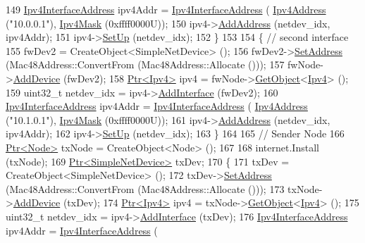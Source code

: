 \begin{DoxyCode}
149     \hyperlink{classns3_1_1Ipv4InterfaceAddress}{Ipv4InterfaceAddress} ipv4Addr = \hyperlink{classns3_1_1Ipv4InterfaceAddress}{Ipv4InterfaceAddress} (
      \hyperlink{classns3_1_1Ipv4Address}{Ipv4Address} (\textcolor{stringliteral}{"10.0.0.1"}), \hyperlink{classns3_1_1Ipv4Mask}{Ipv4Mask} (0xffff0000U));
150     ipv4->\hyperlink{classns3_1_1Ipv4_ad203526cae6a4b86f1bb89e44d2b62f7}{AddAddress} (netdev\_idx, ipv4Addr);
151     ipv4->\hyperlink{classns3_1_1Ipv4_a71b2f8acca4923aef907b50b3196bf23}{SetUp} (netdev\_idx);
152   \}
153 
154   \{ \textcolor{comment}{// second interface}
155     fwDev2 = CreateObject<SimpleNetDevice> ();
156     fwDev2->\hyperlink{classns3_1_1SimpleNetDevice_a968ef3e7318bac29d5f1d7d977029af4}{SetAddress} (Mac48Address::ConvertFrom (Mac48Address::Allocate ()));
157     fwNode->\hyperlink{classns3_1_1Node_a42ff83ee1d5d1649c770d3f5b62375de}{AddDevice} (fwDev2);
158     \hyperlink{classns3_1_1Ptr}{Ptr<Ipv4>} ipv4 = fwNode->\hyperlink{classns3_1_1Object_a13e18c00017096c8381eb651d5bd0783}{GetObject}<\hyperlink{classns3_1_1Ipv4}{Ipv4}> ();
159     uint32\_t netdev\_idx = ipv4->\hyperlink{classns3_1_1Ipv4_a637354128b71bc587ea5a6eeaef42469}{AddInterface} (fwDev2);
160     \hyperlink{classns3_1_1Ipv4InterfaceAddress}{Ipv4InterfaceAddress} ipv4Addr = \hyperlink{classns3_1_1Ipv4InterfaceAddress}{Ipv4InterfaceAddress} (
      \hyperlink{classns3_1_1Ipv4Address}{Ipv4Address} (\textcolor{stringliteral}{"10.1.0.1"}), \hyperlink{classns3_1_1Ipv4Mask}{Ipv4Mask} (0xffff0000U));
161     ipv4->\hyperlink{classns3_1_1Ipv4_ad203526cae6a4b86f1bb89e44d2b62f7}{AddAddress} (netdev\_idx, ipv4Addr);
162     ipv4->\hyperlink{classns3_1_1Ipv4_a71b2f8acca4923aef907b50b3196bf23}{SetUp} (netdev\_idx);
163   \}
164 
165   \textcolor{comment}{// Sender Node}
166   \hyperlink{classns3_1_1Ptr}{Ptr<Node>} txNode = CreateObject<Node> ();
167 
168   internet.Install (txNode);
169   \hyperlink{classns3_1_1Ptr}{Ptr<SimpleNetDevice>} txDev;
170   \{
171     txDev = CreateObject<SimpleNetDevice> ();
172     txDev->\hyperlink{classns3_1_1SimpleNetDevice_a968ef3e7318bac29d5f1d7d977029af4}{SetAddress} (Mac48Address::ConvertFrom (Mac48Address::Allocate ()));
173     txNode->\hyperlink{classns3_1_1Node_a42ff83ee1d5d1649c770d3f5b62375de}{AddDevice} (txDev);
174     \hyperlink{classns3_1_1Ptr}{Ptr<Ipv4>} ipv4 = txNode->\hyperlink{classns3_1_1Object_a13e18c00017096c8381eb651d5bd0783}{GetObject}<\hyperlink{classns3_1_1Ipv4}{Ipv4}> ();
175     uint32\_t netdev\_idx = ipv4->\hyperlink{classns3_1_1Ipv4_a637354128b71bc587ea5a6eeaef42469}{AddInterface} (txDev);
176     \hyperlink{classns3_1_1Ipv4InterfaceAddress}{Ipv4InterfaceAddress} ipv4Addr = \hyperlink{classns3_1_1Ipv4InterfaceAddress}{Ipv4InterfaceAddress} (

\end{DoxyCode}
